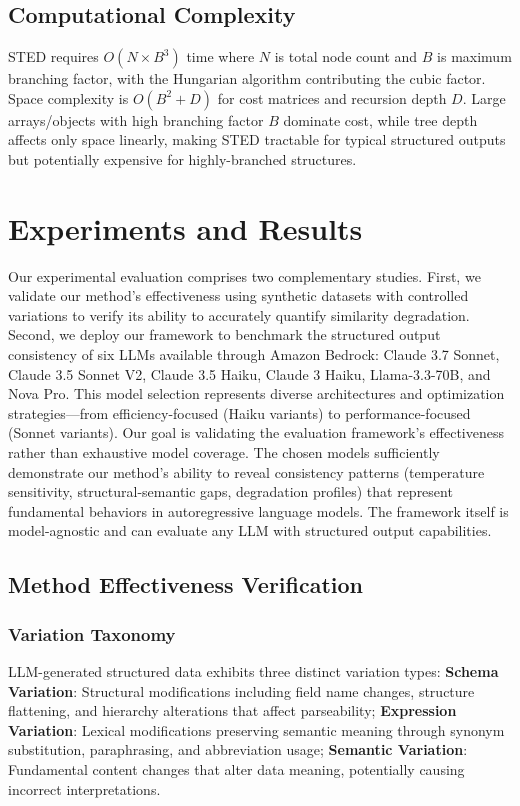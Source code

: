 \documentclass{article}
\begin{document}
\subsection{Computational Complexity}

STED requires $O(N \times B^3)$ time where $N$ is total node count and $B$ is maximum branching factor, with the Hungarian algorithm contributing the cubic factor. Space complexity is $O(B^2 + D)$ for cost matrices and recursion depth $D$. Large arrays/objects with high branching factor $B$ dominate cost, while tree depth affects only space linearly, making STED tractable for typical structured outputs but potentially expensive for highly-branched structures.

\section{Experiments and Results}
\vspace{-2mm}
Our experimental evaluation comprises two complementary studies. First, we validate our method's effectiveness using synthetic datasets with controlled variations to verify its ability to accurately quantify similarity degradation. Second, we deploy our framework to benchmark the structured output consistency of six LLMs available through Amazon Bedrock: Claude 3.7 Sonnet, Claude 3.5 Sonnet V2, Claude 3.5 Haiku, Claude 3 Haiku, Llama-3.3-70B, and Nova Pro. This model selection represents diverse architectures and optimization strategies—from efficiency-focused (Haiku variants) to performance-focused (Sonnet variants). Our goal is validating the evaluation framework's effectiveness rather than exhaustive model coverage. The chosen models sufficiently demonstrate our method's ability to reveal consistency patterns (temperature sensitivity, structural-semantic gaps, degradation profiles) that represent fundamental behaviors in autoregressive language models. The framework itself is model-agnostic and can evaluate any LLM with structured output capabilities.

\subsection{Method Effectiveness Verification}

\subsubsection{Variation Taxonomy}
LLM-generated structured data exhibits three distinct variation types: \textbf{Schema Variation}: Structural modifications including field name changes, structure flattening, and hierarchy alterations that affect parseability; \textbf{Expression Variation}: Lexical modifications preserving semantic meaning through synonym substitution, paraphrasing, and abbreviation usage; \textbf{Semantic Variation}: Fundamental content changes that alter data meaning, potentially causing incorrect interpretations.
\end{document}
